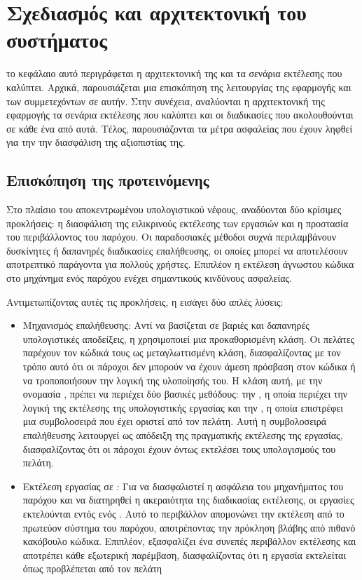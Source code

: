 \chapter{Σχεδιασμός και αρχιτεκτονική του συστήματος}
το κεφάλαιο αυτό περιγράφεται η αρχιτεκτονική της  και τα σενάρια εκτέλεσης που καλύπτει. Αρχικά, παρουσιάζεται μια επισκόπηση της λειτουργίας της εφαρμογής και των συμμετεχόντων σε αυτήν. Στην συνέχεια, αναλύονται η αρχιτεκτονική της εφαρμογής τα σενάρια εκτέλεσης που καλύπτει και οι διαδικασίες που ακολουθούνται σε κάθε ένα από αυτά. Τέλος, παρουσιάζονται τα μέτρα ασφαλείας που έχουν ληφθεί για την την διασφάλιση της αξιοπιστίας της.

\section{Επισκόπηση της προτεινόμενης }

Στο πλαίσιο του αποκεντρωμένου υπολογιστικού νέφους, αναδύονται 
δύο κρίσιμες προκλήσεις: η διασφάλιση της ειλικρινούς εκτέλεσης των εργασιών 
και η προστασία του περιβάλλοντος του παρόχου. Οι παραδοσιακές μέθοδοι συχνά 
περιλαμβάνουν δυσκίνητες ή δαπανηρές διαδικασίες επαλήθευσης, οι οποίες μπορεί 
να αποτελέσουν αποτρεπτικό παράγοντα για πολλούς χρήστες. Επιπλέον η εκτέλεση 
άγνωστου κώδικα στο μηχάνημα ενός παρόχου ενέχει σημαντικούς κινδύνους ασφαλείας.

Αντιμετωπίζοντας αυτές τις προκλήσεις, η  εισάγει δύο απλές λύσεις:
\begin{itemize}
\item Μηχανισμός επαλήθευσης: Αντί να βασίζεται σε βαριές και δαπανηρές 
υπολογιστικές αποδείξεις, η  χρησιμοποιεί μια προκαθορισμένη  κλάση. 
Οι πελάτες παρέχουν τον κώδικά τους ως μεταγλωττισμένη  κλάση, διασφαλίζοντας 
με τον τρόπο αυτό ότι οι πάροχοι δεν μπορούν να έχουν άμεση πρόσβαση στον κώδικα 
ή να τροποποιήσουν την λογική της υλοποίησής του. Η κλάση αυτή, με την ονομασία 
\textit{}, πρέπει να περιέχει δύο βασικές  μεθόδους: την \textit{}, η οποία περιέχει την λογική της εκτέλεσης της υπολογιστικής εργασίας και την \textit{}, η οποία επιστρέφει μια συμβολοσειρά που έχει οριστεί από τον πελάτη. Αυτή η συμβολοσειρά επαλήθευσης λειτουργεί ως απόδειξη της πραγματικής εκτέλεσης της εργασίας, διασφαλίζοντας ότι οι πάροχοι έχουν όντως εκτελέσει τους υπολογισμούς του πελάτη.
\item Εκτέλεση εργασίας σε : Για να διασφαλιστεί η ασφάλεια του μηχανήματος του παρόχου και να διατηρηθεί η ακεραιότητα της διαδικασίας εκτέλεσης, οι εργασίες εκτελούνται εντός ενός . Αυτό το  περιβάλλον απομονώνει την εκτέλεση από το πρωτεύον σύστημα του παρόχου, αποτρέποντας την πρόκληση βλάβης από πιθανό κακόβουλο κώδικα. Επιπλέον, εξασφαλίζει ένα συνεπές περιβάλλον εκτέλεσης και αποτρέπει κάθε εξωτερική παρέμβαση, διασφαλίζοντας ότι η εργασία εκτελείται όπως προβλέπεται από τον πελάτη 
\end{itemize}

